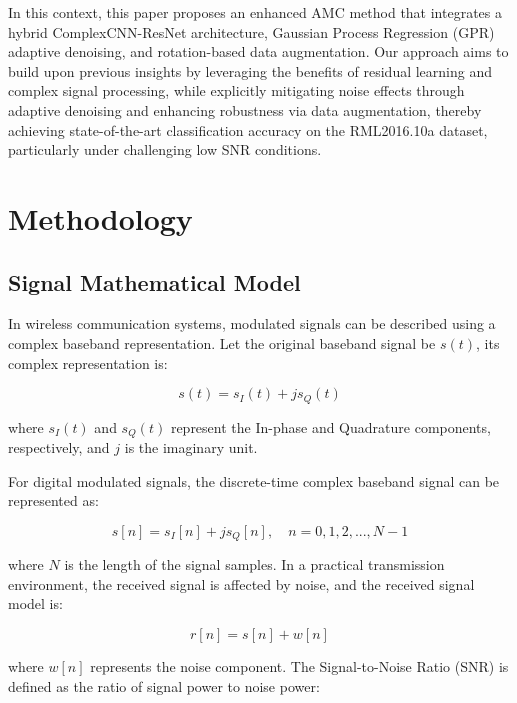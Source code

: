 \documentclass[conference]{IEEEtran}
\begin{document}
In this context, this paper proposes an enhanced AMC method that integrates a hybrid ComplexCNN-ResNet architecture, Gaussian Process Regression (GPR) adaptive denoising, and rotation-based data augmentation. Our approach aims to build upon previous insights by leveraging the benefits of residual learning and complex signal processing, while explicitly mitigating noise effects through adaptive denoising and enhancing robustness via data augmentation, thereby achieving state-of-the-art classification accuracy on the RML2016.10a dataset, particularly under challenging low SNR conditions.





\section{Methodology}

\subsection{Signal Mathematical Model}

In wireless communication systems, modulated signals can be described using a complex baseband representation. Let the original baseband signal be $s(t)$, its complex representation is:

\begin{equation}
s(t) = s_I(t) + js_Q(t)
\end{equation}

where $s_I(t)$ and $s_Q(t)$ represent the In-phase and Quadrature components, respectively, and $j$ is the imaginary unit.

For digital modulated signals, the discrete-time complex baseband signal can be represented as:

\begin{equation}
s[n] = s_I[n] + js_Q[n], \quad n = 0, 1, 2, ..., N-1
\end{equation}

where $N$ is the length of the signal samples. In a practical transmission environment, the received signal is affected by noise, and the received signal model is:

\begin{equation}
r[n] = s[n] + w[n]
\end{equation}

where $w[n]$ represents the noise component. The Signal-to-Noise Ratio (SNR) is defined as the ratio of signal power to noise power:
\end{document}
